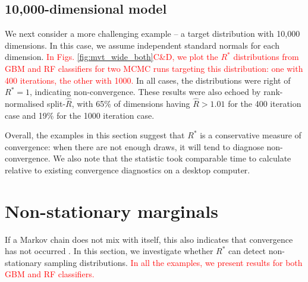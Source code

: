 \documentclass{article}
\begin{document}
\subsection{10,000-dimensional model}
We next consider a more challenging example -- a target distribution with 10,000 dimensions. In this case, we assume independent standard normals for each dimension. \textcolor{red}{In Figs. \ref{fig:mvt_wide_both}C\&D, we plot the $R^*$ distributions from GBM and RF classifiers for two MCMC runs targeting this distribution: one with 400 iterations, the other with 1000.} In all cases, the distributions were right of $R^*=1$, indicating non-convergence. These results were also echoed by rank-normalised split-$\widehat{R}$, with 65\% of dimensions having $\widehat{R}>1.01$ for the 400 iteration case and 19\% for the 1000 iteration case.

Overall, the examples in this section suggest that $R^*$ is a conservative measure of convergence: when there are not enough draws, it will tend to diagnose non-convergence. We also note that the statistic took comparable time to calculate relative to existing convergence diagnostics on a desktop computer.

\section{Non-stationary marginals}\label{sec:non-stationary}
If a Markov chain does not mix with itself, this also indicates that convergence has not occurred \citep{gelman2013bayesian}. In this section, we investigate whether $R^*$ can detect non-stationary sampling distributions. \textcolor{red}{In all the examples, we present results for both GBM and RF classifiers.}
\end{document}
